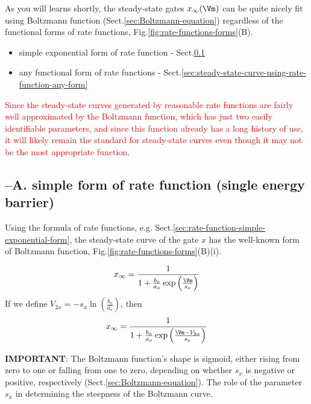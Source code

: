 As you will learns shortly, the steady-state gates $x_\infty(\Vm)$ can be quite
nicely fit using Boltzmann function (Sect.\ref{sec:Boltzmann-equation})
regardless of the functional forms of rate functions,
Fig.\ref{fig:rate-functions-forms}(B).

\begin{itemize}
  \item simple exponential form of rate function -
  Sect.\ref{sec:steady-state-curve-using-rate-function-simple-exponential-form}

  \item any functional form of rate functions -
  Sect.\ref{sec:steady-state-curve-using-rate-function-any-form}
\end{itemize}

\textcolor{red}{Since the steady-state curves generated by reasonable rate
functions are fairly well approximated by the Boltzmann function, which has just
two easily identifiable parameters, and since this function already has a long
history of use, it will likely remain the standard for steady-state curves even
though it may not be the most appropriate function}.



\subsection{--A. simple form of rate function (single energy barrier)}
\label{sec:steady-state-curve-using-rate-function-simple-exponential-form}

Using the formula of rate functions, e.g.
Sect.\ref{sec:rate-function-simple-exponential-form}, the steady-state curve of
the gate $x$ has the well-known form of Boltzmann function,
Fig.\ref{fig:rate-functions-forms}(B)(i).

\begin{equation}
x_\infty = \frac{1}{1 + \frac{b_o}{a_o} \exp\left( \frac{\Vm}{s_x} \right)}
\end{equation}
If we define $V_{2x} = -s_x \ln \left( \frac{b_o}{a_o} \right)$, then
\begin{equation}
x_\infty = \frac{1}{1 + \frac{b_o}{a_o} \exp\left( \frac{\Vm - V_{2x}}{s_x}
\right)}
\end{equation}

{\bf IMPORTANT}: The Boltzmann function's shape is sigmoid, either rising from
zero to one or falling from one to zero, depending on whether $s_x$ is negative
or positive, respectively (Sect.\ref{sec:Boltzmann-equation}). The role of the
parameter $s_x$ in determining the steepness of the Boltzmann curve.

